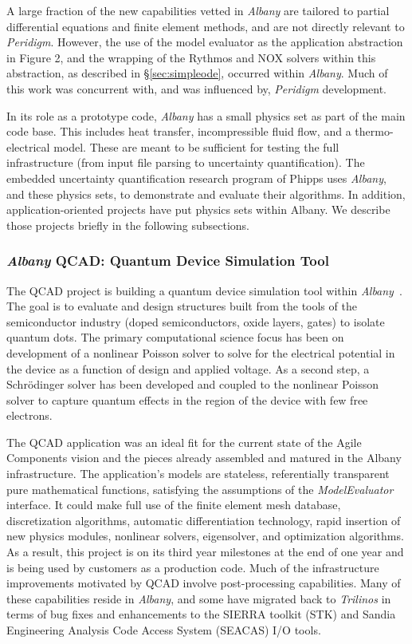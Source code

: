 \documentclass[pdf,ps2pdf,12pt,report]{SANDreport}
\theoremstyle{plain}
\theoremstyle{definition}
\theoremstyle{remark}
\numberwithin{equation}{section}
\begin{document}
A large fraction of the new capabilities vetted in \emph{Albany} are tailored to partial differential equations and finite element methods, and are not directly relevant to \emph{Peridigm}. However, the use of the model evaluator as the application abstraction in Figure 2, and the wrapping of the Rythmos and NOX solvers within this abstraction, as described in \S\ref{sec:simpleode}, occurred within \emph{Albany}. Much of this work was concurrent with, and was influenced by, \emph{Peridigm} development.

In its role as a prototype code, \emph{Albany} has a small physics set as part of the main code base. This includes heat transfer, incompressible fluid flow, and a thermo-electrical model. These are meant to be sufficient for testing the full infrastructure (from input file parsing to uncertainty quantification). The embedded uncertainty quantification research program of Phipps uses \emph{Albany}, and these physics sets, to demonstrate and evaluate their algorithms. In addition, application-oriented projects have put physics sets within Albany. We describe those projects briefly in the following subsections.

\subsubsection{\emph{Albany} QCAD: Quantum Device Simulation Tool} \label{sec:albany:qcad}

The QCAD project is building a quantum device simulation tool within \emph{Albany}~\cite{QCADWebPage:2011}. The goal is to evaluate and design structures built from the tools of the semiconductor industry (doped semiconductors, oxide layers, gates) to isolate quantum dots. The primary computational science focus has been on development of a nonlinear Poisson solver to solve for the electrical potential in the device as a function of design and applied voltage. As a second step, a Schr\"{o}dinger solver has been developed and coupled to the nonlinear Poisson solver to capture quantum effects in the region of the device with few free electrons.

The QCAD application was an ideal fit for the current state of the Agile Components vision and the pieces already assembled and matured in the Albany infrastructure. The application's models are stateless, referentially transparent pure mathematical functions, satisfying the assumptions of the \emph{ModelEvaluator} interface. It could make full use of the finite element mesh database, discretization algorithms, automatic differentiation technology, rapid insertion of new physics modules, nonlinear solvers, eigensolver, and optimization algorithms. As a result, this project is on its third year milestones at the end of one year and is being used by customers as a production code. Much of the infrastructure improvements motivated by QCAD involve post-processing capabilities.  Many of these capabilities reside in \emph{Albany}, and some have migrated back to \emph{Trilinos} in terms of bug fixes and enhancements to the SIERRA toolkit (STK) and Sandia Engineering Analysis Code Access System (SEACAS) I/O tools.
\end{document}

